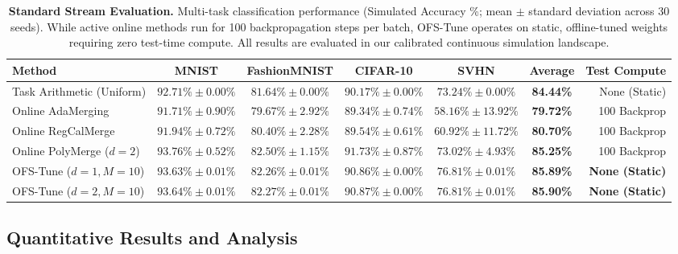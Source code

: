 \begin{table}[t]
\caption{\textbf{Standard Stream Evaluation.} Multi-task classification performance (Simulated Accuracy \%; mean $\pm$ standard deviation across 30 seeds). While active online methods run for 100 backpropagation steps per batch, OFS-Tune operates on static, offline-tuned weights requiring zero test-time compute. All results are evaluated in our calibrated continuous simulation landscape.}
\label{tab:standard_stream}
\vskip 0.15in
\begin{center}
\begin{footnotesize}
\begin{sc}
\setlength{\tabcolsep}{1.8pt}
\begin{tabular}{lcccccr}
\toprule
Method & MNIST & FashionMNIST & CIFAR-10 & SVHN & \textbf{Average} & Test Compute \\
\midrule
Task Arithmetic (Uniform) & $92.71\% \pm 0.00\%$ & $81.64\% \pm 0.00\%$ & $90.17\% \pm 0.00\%$ & $73.24\% \pm 0.00\%$ & \textbf{84.44\%} & None (Static) \\
Online AdaMerging & $91.71\% \pm 0.90\%$ & $79.67\% \pm 2.92\%$ & $89.34\% \pm 0.74\%$ & $58.16\% \pm 13.92\%$ & \textbf{79.72\%} & 100 Backprop \\
Online RegCalMerge & $91.94\% \pm 0.72\%$ & $80.40\% \pm 2.28\%$ & $89.54\% \pm 0.61\%$ & $60.92\% \pm 11.72\%$ & \textbf{80.70\%} & 100 Backprop \\
Online PolyMerge ($d=2$) & $93.76\% \pm 0.52\%$ & $82.50\% \pm 1.15\%$ & $91.73\% \pm 0.87\%$ & $73.02\% \pm 4.93\%$ & \textbf{85.25\%} & 100 Backprop \\
\midrule
OFS-Tune ($d=1, M=10$) & $93.63\% \pm 0.01\%$ & $82.26\% \pm 0.01\%$ & $90.86\% \pm 0.00\%$ & $76.81\% \pm 0.01\%$ & \textbf{85.89\%} & \textbf{None (Static)} \\
OFS-Tune ($d=2, M=10$) & $93.64\% \pm 0.01\%$ & $82.27\% \pm 0.01\%$ & $90.87\% \pm 0.00\%$ & $76.81\% \pm 0.01\%$ & \textbf{85.90\%} & \textbf{None (Static)} \\
\bottomrule
\end{tabular}
\end{sc}
\end{footnotesize}
\end{center}
\vskip -0.1in
\end{table}

\subsection{Quantitative Results and Analysis}


